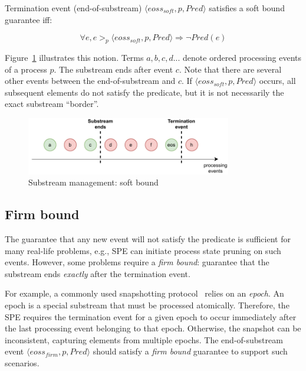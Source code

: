 \begin{definition}
Termination event (end-of-substream) $\langle eoss_{soft}, p, Pred\rangle$ satisfies a soft bound guarantee iff:

\begin{equation}
\forall e, e >_p \langle eoss_{soft}, p, Pred\rangle \Rightarrow \neg Pred(e)
\end{equation}
\end{definition}

Figure~\ref{general_guarantees} illustrates this notion. Terms $a,b,c,d...$ denote ordered processing events of a process $p$. The substream ends after event $c$. Note that there are several other events between the end-of-substream and $c$. If $\langle eoss_{soft}, p, Pred\rangle$ occurs, all subsequent elements do not satisfy the predicate, but it is not necessarily the exact substream ``border''.

\begin{figure}[t]
  \centering
  \includegraphics[width=0.80\textwidth]{Chapters/SubstreamConsistency/pics/general-guarantee.pdf}
  \caption{Substream management: soft bound}
  \label{general_guarantees}
\end{figure}

\subsection{Firm bound}

The guarantee that any new event will not satisfy the predicate is sufficient for many real-life problems, e.g., SPE can initiate process state pruning on such events. However, some problems require a {\em firm bound}: guarantee that the substream ends {\em exactly} after the termination event. 

For example, a commonly used snapshotting protocol~\cite{2015arXiv150608603C, jacques2016consistent} relies on an {\em epoch}. An epoch is a special substream that must be processed atomically. Therefore, the SPE requires the termination event for a given epoch to occur immediately after the last processing event belonging to that epoch. Otherwise, the snapshot can be inconsistent, capturing elements from multiple epochs. The end-of-substream event $\langle eoss_{firm}, p, Pred\rangle$ should satisfy a {\em firm bound } guarantee to support such scenarios.

